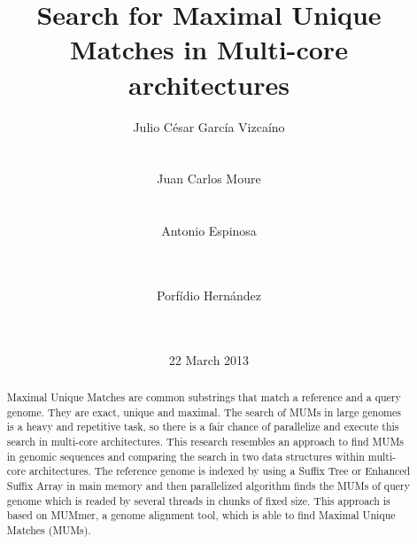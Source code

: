 \documentclass{acm_proc_article-sp}
\begin{document}
\title{Search for Maximal Unique Matches in Multi-core architectures}

%
\author{
\alignauthor Julio C\'esar Garc\'ia Vizca\'ino\\
       \\
       \\
\alignauthor Juan Carlos Moure\\
       \\
       \\
\alignauthor Antonio Espinosa\\
       \\
       \\
\and  %
\alignauthor Porf\'idio Hern\'andez\\
       \\
       \\
}

\date{22 March 2013}

\maketitle
\begin{abstract}
  Maximal Unique Matches are common substrings that match a reference and a query genome. They are exact, unique and maximal. The search of MUMs in large genomes is a heavy and repetitive task, so there is a fair chance of parallelize and execute this search in multi-core architectures. This research resembles an approach to find MUMs in genomic sequences and comparing the search in two data structures within multi-core architectures. The reference genome is indexed by using a Suffix Tree or Enhanced Suffix Array in main memory and then parallelized algorithm finds the MUMs of query genome which is readed by several threads in chunks of fixed size. This approach is based on MUMmer, a genome alignment tool, which is able to find Maximal Unique Matches (MUMs). 
\end{abstract}
\end{document}

